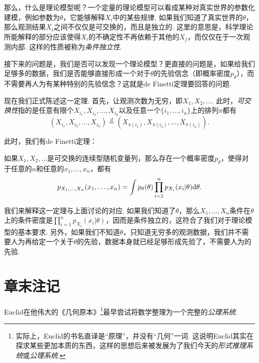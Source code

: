 那么，什么是理论模型呢？一个定量的理论模型可以看成某种对真实世界的参数化建模，例如参数为$\theta$，它能够解释$X_i$中的某些规律. 如果我们知道了真实世界的$\theta$，那么观测结果$X_i$之间不仅仅是可交换的，而且是独立的. 这里的意思是，科学理论所能解释的部分应该使得$X_i$的不确定性不再依赖于其他的$X_j$，而仅仅在于一次观测内部. 这样的性质被称为\emph{条件独立性}. 

接下来的问题是，我们是否可以发现一个理论模型？更直接的问题是，如果给我们足够多的数据，我们是否能够直接形成一个对于$\theta$的先验信念（即概率密度$p_\theta$），而不需要再人为有某种特别的先验信念？这就是de Finetti定理要回答的问题.

现在我们正式陈述这一定理. 首先，让观测次数为无穷，即$X_1,X_2,\dots$. 此时，\emph{可交换性}指的是任意有限个$X_{i_1},X_{i_2},\dots,X_{i_n}$以及任意一个$\{i_1,\dots,i_n\}$上的排列$\pi$都有
\[
    (X_{i_1},X_{i_2},\dots,X_{i_n})\stackrel{d}{=}(X_{\pi(i_1)},X_{\pi(i_2)},\dots,X_{\pi(i_n)}).
\]

此时，我们有de Finetti定理：

\begin{theorem}[de Finetti定理]
    如果$X_1,X_2,\dots$是可交换的连续型随机变量列，那么存在一个概率密度$p_\theta$，使得对于任意的$n$和任意的$x_1,\dots,x_n$，都有
    \[
        p_{X_1,\dots,X_n}(x_1,\dots,x_n) = \int p_\theta(\theta)\prod_{i=1}^n p_{X_i}(x_i|\theta)\mathrm{d}\theta.
    \]
\end{theorem}

我们来解释这一定理与上面讨论的对应. 如果我们知道了$\theta$，那么$X_1,\dots,X_n$条件在$\theta$上的条件密度是$\prod_{i=1}^n p_{X_i}(x_i|\theta)$，因而是条件独立的，这符合了我们对于理论模型的基本要求. 另外，如果我们不知道$\theta$，只知道无穷多的观测数据，我们并不需要人为再给定一个关于$\theta$的先验，数据本身就已经足够形成先验了，不需要人为的先验. 

\section{章末注记} 

Euclid在他伟大的《几何原本》\footnote{实际上，Euclid的书名直译是“原理”，并没有“几何”一词. 这说明Euclid其实在探求某些更加本质的东西，这样的思想后来被发展为了我们今天的\emph{形式推理系统}或\emph{公理系统}.}最早尝试将数学整理为一个完整的\emph{公理系统}. 